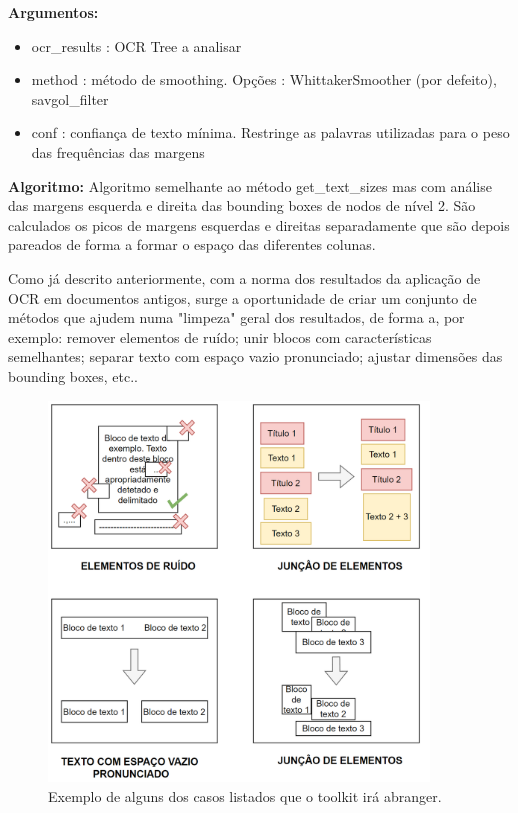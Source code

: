 \textbf{Argumentos:}
\begin{itemize}\setlength\itemsep{-0.3em}
	\item ocr\_results : OCR Tree a analisar
	\item method : método de smoothing. Opções : WhittakerSmoother (por defeito), savgol\_filter
	\item conf : confiança de texto mínima. Restringe as palavras utilizadas para o peso das frequências das margens
\end{itemize}

\textbf{Algoritmo:} Algoritmo semelhante ao método get\_text\_sizes mas com análise das margens esquerda e direita das bounding boxes de nodos de nível 2. São calculados os picos de margens esquerdas e direitas separadamente que são depois pareados de forma a formar o espaço das diferentes colunas.





\label{contribution_clean_ocr}

Como já descrito anteriormente, com a norma dos resultados da aplicação de OCR em documentos antigos, surge a oportunidade de criar um conjunto de métodos que ajudem numa "limpeza" geral dos resultados, de forma a, por exemplo: remover elementos de ruído; unir blocos com características semelhantes; separar texto com espaço vazio pronunciado; ajustar dimensões das bounding boxes, etc..


\begin{figure}[H]
	\centering
	\includegraphics[width=0.9\textwidth]{images/ilustracoes/clean_ocr_cases_example.png}
	\caption{Exemplo de alguns dos casos listados que o toolkit irá abranger.}
	\label{fig:clean_ocr_cases_example}
\end{figure}




